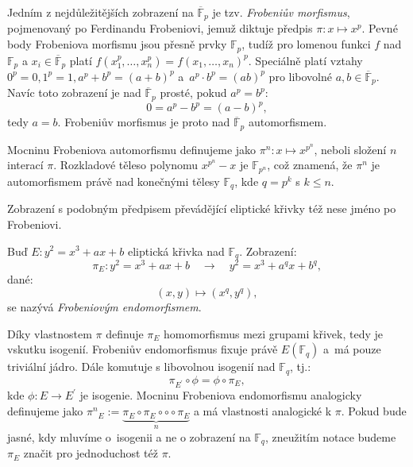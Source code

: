 \documentclass[12pt]{report}
\begin{document}
Jedním z nejdůležitějších zobrazení na $\overline{\mathbb{F}}_p$ je tzv. \textit{Frobeniův morfismus}, pojmenovaný po Ferdinandu Frobeniovi, jemuž diktuje předpis $\pi: x \mapsto x^p$. Pevné body Frobeniova morfismu jsou přesně prvky $\mathbb{F}_p$, tudíž pro lomenou funkci $f$ nad $\mathbb{F}_p$ a $x_i \in \overline{\mathbb{F}}_p$ platí $f(x_1^p,\dots,x_n^p)=f(x_1,\dots,x_n)^p$. Speciálně platí vztahy $0^p = 0, 1^p = 1, a^p + b^p = (a+b)^p$ a~$a^p \cdot b^p = (ab)^p$ pro libovolné $a,b \in \overline{\mathbb{F}}_p$. Navíc toto zobrazení je nad $\overline{\mathbb{F}}_p$ prosté, pokud $a^p = b^p$:
\begin{equation*}
0 = a^p - b^p =  (a-b)^p,
\end{equation*} tedy $a=b$. Frobeniův morfismus je proto nad $\overline{\mathbb{F}}_p$ automorfismem.

Mocninu Frobeniova automorfismu definujeme jako $\pi^n : x \mapsto x^{p^n}$, neboli složení $n$ interací $\pi$. Rozkladové těleso polynomu $x^{p^n}-x$ je $\mathbb{F}_{p^n}$, což znamená, že $\pi^n$ je automorfismem právě nad konečnými tělesy $\mathbb{F}_q$, kde $q =p^k$ s $k \leqslant n$. 

Zobrazení s podobným předpisem převádějící eliptické křivky též nese jméno po Frobeniovi.
\begin{definice}
Buď $E: y^2 = x^3+ax+b$ eliptická křivka nad $\mathbb{F}_q$. Zobrazení:
\begin{equation*}
\pi_E : y^2 = x^3+ax+b \quad \longrightarrow \quad y^2 = x^3 + a^q x + b^q,
\end{equation*}
dané:
\begin{equation*}
(x,y) \longmapsto (x^q,y^q),
\end{equation*}
se nazývá \textit{Frobeniovým endomorfismem}.
\end{definice}

Díky vlastnostem $\pi$ definuje $\pi_E$ homomorfismus mezi grupami křivek, tedy je vskutku isogenií. Frobeniův endomorfismus fixuje právě $E(\mathbb{F}_q)$ a~má pouze triviální jádro. Dále komutuje s libovolnou isogenií nad $\mathbb{F}_q$, tj.:
\begin{equation*}
\pi_{E^\prime} \circ \phi = \phi \circ \pi_E,
\end{equation*}
kde $\phi : E \longrightarrow E^\prime$ je isogenie. Mocninu Frobeniova endomorfismu analogicky definujeme jako ${\pi^n}_E := \underbrace{\pi_E \circ \pi_E \circ \circ \circ \pi_E}_{n}$ a má vlastnosti analogické k $\pi$. Pokud bude jasné, kdy mluvíme o~isogenii a ne o zobrazení na $\mathbb{F}_q$, zneužitím notace budeme $\pi_E$ značit pro jednoduchost též $\pi$.
\end{document}
